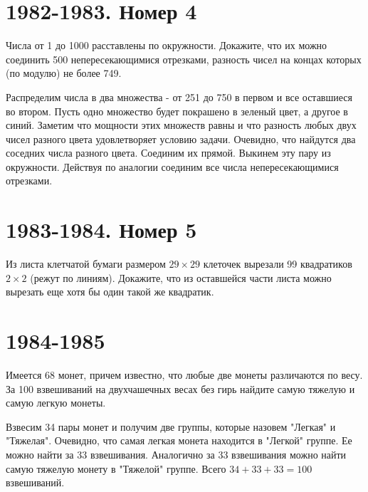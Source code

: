 \documentclass[11pt, a4paper]{problems_template}
\begin{document}
\chapter{1982-1983. Номер 4}

\begin{exercise}
Числа от 1 до 1000 расставлены по окружности. Докажите, что их можно соединить 500 непересекающимися отрезками, разность чисел на концах которых (по модулю) не более 749.
\end{exercise}

\begin{Solution}
Распределим числа в два множества - от 251 до 750 в первом и все оставшиеся во втором. Пусть одно множество будет покрашено в зеленый цвет, а другое в синий. Заметим что мощности этих множеств равны и что разность любых двух чисел разного цвета удовлетворяет условию задачи. Очевидно, что найдутся два соседних числа разного цвета. Соединим их прямой. Выкинем эту пару из окружности. Действуя по аналогии соединим все числа непересекающимися отрезками. 
\end{Solution}

\chapter{1983-1984. Номер 5}

\begin{exercise}
Из листа клетчатой бумаги размером $29 \times 29$ клеточек вырезали 99 квадратиков $2 \times 2$ (режут по линиям). Докажите, что из оставшейся части листа можно вырезать еще хотя бы один такой же квадратик.
\end{exercise}

\chapter{1984-1985}

\begin{exercise}
Имеется 68 монет, причем известно, что любые две монеты различаются по весу. За 100 взвешиваний на \newline двухчашечных весах без гирь найдите самую тяжелую и самую легкую монеты.
\end{exercise}

\begin{Solution}
Взвесим 34 пары монет и получим две группы, которые назовем "Легкая" и "Тяжелая". Очевидно, что самая легкая монета находится в "Легкой" группе. Ее можно найти за 33 взвешивания. Аналогично за 33 взвешивания можно найти самую тяжелую монету в "Тяжелой" группе. Всего $34 + 33 + 33 = 100$ взвешиваний.
\end{Solution}
\end{document}
